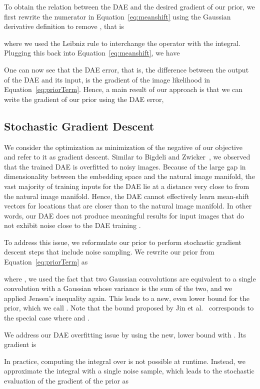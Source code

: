 \documentclass{article}
\begin{document}
To obtain the relation between the DAE and the desired gradient of our prior, we first rewrite the numerator in Equation~\eqref{eq:meanshift} using the Gaussian derivative definition to remove , that is

where we used the Leibniz rule to interchange the  operator with the integral. Plugging this back into Equation~\eqref{eq:meanshift}, we have

One can now see that the DAE error, that is, the difference  between the output of the DAE and its input, is the gradient of the image likelihood in Equation~\eqref{eq:priorTerm}. Hence, a main result of our approach is that we can write the gradient of our prior using the DAE error,



\subsection{Stochastic Gradient Descent}
\label{sec:optimization}

We consider the optimization as minimization of the negative of our objective  and refer to it as gradient descent.
Similar to Bigdeli and Zwicker~\cite{bigdeli2017image}, we observed that the trained DAE is overfitted to noisy images. Because of the large gap in dimensionality between the embedding space and the natural image manifold, the vast majority of training inputs for the DAE lie at a distance very close to  from the natural image manifold. Hence, the DAE cannot effectively learn mean-shift vectors for locations that are closer than  to the natural image manifold. In other words, our DAE does not produce meaningful results for input images that do not exhibit noise close to the DAE training .
	
To address this issue, we reformulate our prior to perform stochastic gradient descent steps that include noise sampling. We rewrite our prior from Equation~\eqref{eq:priorTerm} as

where , we used the fact that two Gaussian convolutions are equivalent to a single convolution with a Gaussian whose variance is the sum of the two, and we applied Jensen's inequality again. This leads to a new, even lower bound for the prior, which we call . Note that the bound proposed by Jin et al.~\cite{Jin:2017:NBD} corresponds to the special case where  and .

We address our DAE overfitting issue by using the new, lower bound  with . Its gradient is

In practice, computing the integral over  is not possible at runtime. Instead, we approximate the integral with a single noise sample, which leads to the stochastic evaluation of the gradient of the prior as
\end{document}
